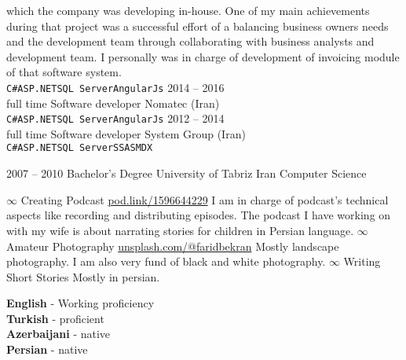 \documentclass[9pt]{developercv} %
\begin{document}
\begin{entrylist}
{which the company was developing in-house. One of my main achievements during
that project was a successful effort of a balancing business owners needs and the
development team through collaborating with business analysts and development
team. I personally was in charge of development of invoicing module of that
software system. \\ \texttt{C\#}\slashsep\texttt{ASP.NET}\slashsep\texttt{SQL Server}\slashsep\texttt{AngularJs}}
\entry
		{2014 -- 2016\\\footnotesize{full time}}
		{Software developer}
		{Nomatec (Iran)}
		{\\ \texttt{C\#}\slashsep\texttt{ASP.NET}\slashsep\texttt{SQL Server}\slashsep\texttt{AngularJs}}
	\entry
		{2012 -- 2014\\\footnotesize{full time}}
		{Software developer}
		{System Group (Iran)}
		{\\ \texttt{C\#}\slashsep\texttt{ASP.NET}\slashsep\texttt{SQL Server}\slashsep\texttt{SSAS}\slashsep\texttt{MDX}}
\end{entrylist}



\begin{entrylist}
	\entry
		{2007 -- 2010}
		{Bachelor's Degree}
		{University of Tabriz Iran}
		{Computer Science}
\end{entrylist}

\begin{entrylist}
		\entry
		{$\infty$}
		{Creating Podcast}
		{\href{https://pod.link/1596644229}{pod.link/1596644229}}
		{I am in charge of podcast's technical aspects like recording and distributing episodes. The podcast I have working on with my wife is about narrating stories for children in Persian language.}
		\entry
		{$\infty$}
		{Amateur Photography}
		{\href{https://unsplash.com/@faridbekran}{unsplash.com/@faridbekran}}
		{Mostly landscape photography. I am also very fund of black and white photography.}
		\entry
		{$\infty$}
		{Writing Short Stories}
		{ }
		{Mostly in persian.}
\end{entrylist}

\begin{minipage}[t]{0.3\textwidth}
	\vspace{-\baselineskip} %

	
	\textbf{English} - Working proficiency\\
	\textbf{Turkish} - proficient\\
	\textbf{Azerbaijani} - native\\	
	\textbf{Persian} - native
\end{minipage}

\end{document}
